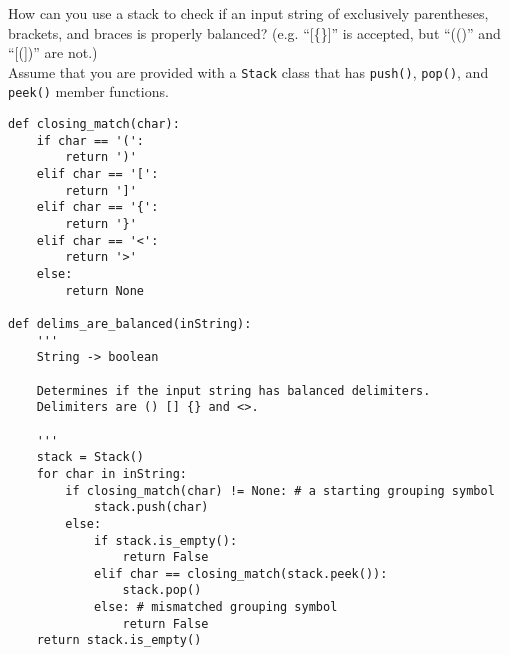 How can you use a stack to check if an input string
of exclusively parentheses, brackets, and braces is properly balanced?
(e.g. ``[\{\}]'' is accepted, but ``(()'' and ``[(])'' are not.)\\
Assume that you are provided with a \texttt{Stack} class that has \texttt{push()}, \texttt{pop()}, and \texttt{peek()} member functions.

\begin{answer}
\begin{lstlisting}
def closing_match(char):
	if char == '(':
		return ')'
	elif char == '[':
		return ']'
	elif char == '{':
		return '}'
	elif char == '<':
		return '>'
	else:
		return None

def delims_are_balanced(inString):
    '''
    String -> boolean
    
    Determines if the input string has balanced delimiters.
    Delimiters are () [] {} and <>.
    
    '''
    stack = Stack()
    for char in inString:
        if closing_match(char) != None: # a starting grouping symbol
            stack.push(char)
		else:
			if stack.is_empty():
				return False
			elif char == closing_match(stack.peek()):
				stack.pop()
			else: # mismatched grouping symbol
				return False
    return stack.is_empty()
\end{lstlisting}
\end{answer}
